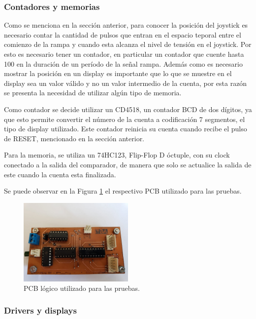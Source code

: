 \subsubsection{Contadores y memorias}
Como se menciona en la secci\'on anterior, para conocer la posici\'on del joystick es necesario contar la cantidad de pulsos que entran en el espacio teporal entre el comienzo de la rampa y cuando esta alcanza el nivel de tensi\'on en el joystick. Por esto es necesario tener un contador, en particular un contador que cuente hasta 100 en la duraci\'on de un per\'iodo de la se\~nal rampa. Adem\'as como es necesario mostrar la posici\'on en un display es importante que lo que se muestre en el display sea un valor v\'alido y no un valor intermedio de la cuenta, por esta raz\'on se presenta la necesidad de utilizar alg\'un tipo de memoria.


Como contador se decide utilizar un CD4518, un contador BCD de dos d\'igitos, ya que esto permite convertir el n\'umero de la cuenta a codificaci\'on 7 segmentos, el tipo de display utilizado. Este contador reinicia su cuenta cuando recibe el pulso de RESET, mencionado en la secci\'on anterior.

Para la memoria, se utiliza un 74HC123, Flip-Flop D \'octuple,  con su clock conectado a la salida del comparador, de manera que solo se actualice la salida de este cuando la cuenta esta finalizada. 

Se puede observar en la Figura \ref{fig:LOGIC_PCB} el respectivo PCB utilizado para las pruebas.
\begin{figure}[H]
    \centering
    \includegraphics[width=0.5\textwidth]{../EJ8/Recursos/DIGITAL_PCB}
    \caption{PCB l\'ogico utilizado para las pruebas.}
    \label{fig:LOGIC_PCB}
\end{figure}

\subsubsection{Drivers y displays}

